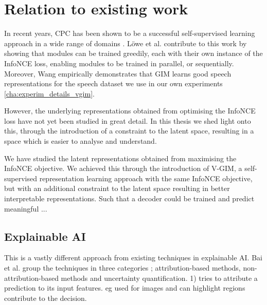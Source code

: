 
\chapter{Relation to existing work}

In recent years, CPC has been shown to be a successful self-supervised learning approach in a wide range of domains \cite{stackeEvaluationContrastivePredictive2020, dehaanContrastivePredictiveCoding2021, luSemiSupervisedHistologyClassification2019, bhatiSegmentalContrastivePredictive2021b, deldariTimeSeriesChange2021, henaffDataEfficientImageRecognition2020}. Löwe et al. contribute to this work by showing that modules can be trained greedily, each with their own instance of the InfoNCE loss, enabling modules to be trained in parallel, or sequentially. Moreover, Wang \cite{meihanwangSpeechRepresentationLearning2019} empirically demonstrates that GIM learns good speech representations for the speech dataset we use in our own experiments \ref{cha:experim_details_vgim}.

However, the underlying representations obtained from optimising the InfoNCE loss have not yet been studied in great detail. In this thesis we shed light onto this, through the introduction of a constraint to the latent space, resulting in a space which is easier to analyse and understand.

We have studied the latent representations obtained from maximising the InfoNCE objective. 
We achieved this through the introduction of V-GIM, a self-supervised representation learning approach with the same InfoNCE objective, but with an additional constraint to the latent space resulting in better interpretable representations. Such that a decoder could be trained and predict meaningful ...
	
\section{Explainable AI}
	This is a vastly different approach from existing techniques in explainable AI. Bai et al. group the techniques in three categories \cite{baiExplainableDeepLearning2021}; attribution-based methods, non-attribution-based methods and uncertainty quantification.
	1) tries to attribute a prediction to its input features. eg used for images and can highlight regions contribute to the decision.
	
